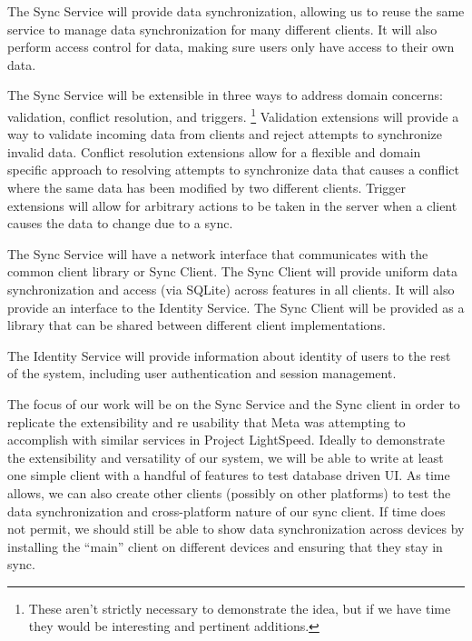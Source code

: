 \documentclass[12pt]{article}
\begin{document}
    The Sync Service will provide data synchronization, allowing us to reuse the same service to manage data synchronization for many different clients.
    It will also perform access control for data, making sure users only have access to their own data.

    The Sync Service will be extensible in three ways to address domain concerns: validation, conflict resolution, and triggers.
        \footnote{These aren't strictly necessary to demonstrate the idea, but if we have time they would be interesting and pertinent additions.}
        Validation extensions will provide a way to validate incoming data from clients and reject attempts to synchronize invalid data.
        Conflict resolution extensions allow for a flexible and domain specific approach to resolving attempts to synchronize data that causes a conflict where the same data has been modified by two different clients.
        Trigger extensions will allow for arbitrary actions to be taken in the server when a client causes the data to change due to a sync.

    The Sync Service will have a network interface that communicates with the common client library or Sync Client.
    The Sync Client will provide uniform data synchronization and access (via SQLite) across features in all clients.
    It will also provide an interface to the Identity Service.
        The Sync Client will be provided as a library that can be shared between different client implementations.

    The Identity Service will provide information about identity of users to the rest of the system, including user authentication and session management.

    The focus of our work will be on the Sync Service and the Sync client in order to replicate the extensibility and re usability that Meta was attempting to accomplish with similar services in Project LightSpeed.
    Ideally to demonstrate the extensibility and versatility of our system, we will be able to write at least one simple client with a handful of features to test database driven UI.
    As time allows, we can also create other clients (possibly on other platforms) to test the data synchronization and cross-platform nature of our sync client.
    If time does not permit, we should still be able to show data synchronization across devices by installing the “main” client on different devices and ensuring that they stay in sync.
\end{document}
